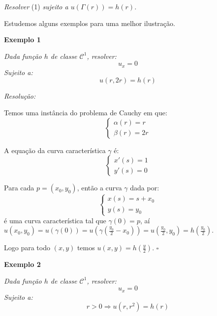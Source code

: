 \documentclass[11pt,twoside,a4paper]{book}
\begin{document}
\noindent
\textit{Resolver} (1) \textit{sujeito a $u(\Gamma(r))=h(r)$.}

\bigskip
\noindent
Estudemos alguns exemplos para uma melhor ilustração.

\bigskip
\noindent
\textbf{Exemplo 1}

\smallskip
\noindent
\textit{Dada função $h$ de classe $\mathcal{C}^1$, resolver:}
\begin{equation*}
    u_x=0
\end{equation*}
\textit{Sujeito a:}
\begin{equation*}
    u(r,2r)=h(r)
\end{equation*}

\smallskip
\noindent
\textit{Resolução:}

\noindent
Temos uma instância do problema de Cauchy em que:
\begin{equation*}
    \begin{cases}
    \alpha(r)=r       \\
    \beta(r)=2r      
    \end{cases}
\end{equation*}

\smallskip
\noindent
A equação da curva característica $\gamma$ é:
\begin{equation*}
    \begin{cases}
    x'(s)=1       \\
    y'(s)=0    
    \end{cases}
\end{equation*}

\smallskip
\noindent
Para cada $p=(x_0,y_0)$, então a curva $\gamma$ dada por:
\begin{equation*}
    \begin{cases}
    x(s)=s+x_0       \\
    y(s)=y_0      
    \end{cases}
\end{equation*}
é uma curva característica tal que $\gamma(0)=p$, aí $u(x_0,y_0)=u\left(\gamma(0)\right)=u\left(\gamma\left(\frac{y_0}{2}-x_0\right)\right)=u\left(\frac{y_0}{2},y_0\right)=h\left(\frac{y_0}{2}\right)$.

\medskip
\noindent
Logo para todo $(x,y)$ temos $u(x,y)=h\left(\frac{y}{2}\right)$. $\square$

\bigskip
\noindent
\textbf{Exemplo 2}

\smallskip
\noindent
\textit{Dada função $h$ de classe $\mathcal{C}^1$, resolver:}
\begin{equation*}
    u_x=0
\end{equation*}
\textit{Sujeito a:}
\begin{equation*}
    r>0\Rightarrow u(r,r^2)=h(r)
\end{equation*}
\end{document}
